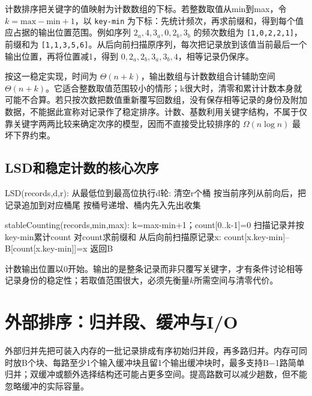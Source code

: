 计数排序把关键字的值映射为计数数组的下标。若整数取值从min到max，令 \(k=\mathrm{max}-\mathrm{min}+1\)，以 \texttt{key-min} 为下标：先统计频次，再求前缀和，得到每个值应占据的输出位置范围。例如序列 \(2_a,4,3_a,0,2_b,3_b\) 的频次数组为 \texttt{[1,\allowbreak{}0,\allowbreak{}2,\allowbreak{}2,\allowbreak{}1]}，前缀和为 \texttt{[1,\allowbreak{}1,\allowbreak{}3,\allowbreak{}5,\allowbreak{}6]}。从后向前扫描原序列，每次把记录放到该值当前最后一个输出位置，再将位置减1，得到 \(0,2_a,2_b,3_a,3_b,4\)，相等记录仍保序。

按这一稳定实现，时间为 \(\Theta(n+k)\)，输出数组与计数数组合计辅助空间 \(\Theta(n+k)\)。它适合整数取值范围较小的情形；k很大时，清零和累计计数本身就可能不合算。若只按次数把数值重新覆写回数组，没有保存相等记录的身份及附加数据，不能据此宣称对记录作了稳定排序。计数、基数利用关键字结构，不属于仅靠关键字两两比较来确定次序的模型，因而不直接受比较排序的 \(\Omega(n\log n)\) 最坏下界约束。

\subsection{LSD和稳定计数的核心次序}\label{DS08-distribute-code}

\begin{codeblock}[language={}]
LSD(records,d,r):
    从最低位到最高位执行d轮:
        清空r个桶
        按当前序列从前向后，把记录追加到对应桶尾
        按桶号递增、桶内先入先出收集
\end{codeblock}

\begin{codeblock}[language={}]
stableCounting(records,min,max):
    k=max-min+1；count[0..k-1]=0
    扫描记录并按key-min累计count
    对count求前缀和
    从后向前扫描原记录x:
        count[x.key-min]--
        B[count[x.key-min]]=x
    返回B
\end{codeblock}

计数输出位置以0开始。输出的是整条记录而非只覆写关键字，才有条件讨论相等记录身份的稳定性；若取值范围很大，必须先衡量\(k\)所需空间与清零代价。

\section{外部排序：归并段、缓冲与I/O}\label{DS08-10}

外部归并先把可装入内存的一批记录排成有序初始归并段，再多路归并。内存可同时放B个块、每路至少1个输入缓冲块且留1个输出缓冲块时，最多支持B\ensuremath{-}1路简单归并；双缓冲或额外选择结构还可能占更多空间。提高路数可以减少趟数，但不能忽略缓冲的实际容量。

